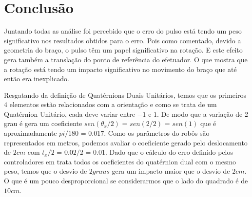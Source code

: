 \section{Conclusão}

Juntando todas as análise foi percebido que o erro do pulso está tendo um peso significativo nos resultados obtidos para o erro. Pois como comentado, devido a geometria do braço, o pulso têm um papel significativo na rotação. E este efeito gera também a translação do ponto de referência do efetuador. O que mostra que a rotação está tendo um impacto significativo no movimento do braço que até então era inexplicado.

Resgatando da definição de Quatérnions Duais Unitários, temos que os primeiros 4 elementos estão relacionados com a orientação e como se trata de um Quatérnion Unitário, cada deve variar entre $-1$ e $1$. De modo que a variação de 2 grau é gera um coeficiente $sen(\theta_x/2)$ =  $sen(2/2)$ = $sen(1)$ que é aproximadamente $pi/180$ = $0.017$. Como os parâmetros do robôs são representados em metros, podemos avaliar o coeficiente gerado pelo deslocamento de $2cm$ com $t_x/2$ = $0.02/2$ = $0.01$. Dado que o cálculo do erro definido pelos controladores em \cite{marcosps2016} trata todos os coeficientes do quatérnion dual com o mesmo peso, temos que o desvio de $2 graus$ gera um impacto maior que o desvio de $2cm$. O que é um pouco desproporcional se considerarmos que o lado do quadrado é de $10cm$.

